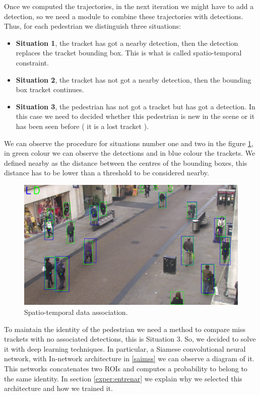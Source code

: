 Once we computed the trajectories, in the next iteration we might have to add a detection, so we need a module to combine these trajectories with detections. Thus, for each pedestrian we distinguish three situations:

\begin{itemize}



\item \textbf{Situation 1}, the tracket has got a nearby detection, then the detection replaces the tracket bounding box. This is what is called spatio-temporal constraint.

\item \textbf{Situation 2}, the tracket has not got a nearby detection, then the bounding box tracket continues.

\item \textbf{Situation 3}, the pedestrian has not got a tracket but has got a detection. In this case we need to decided whether this pedestrian is new in the scene or it has been seen before ( it is a lost tracket ).

\end{itemize}

We can observe the procedure for situations number one and two in the figure \ref{data1}, in green colour we can observe the detections and in blue colour the trackets. We defined nearby as the distance between the centres of the bounding boxes, this distance has to be lower than a threshold to be considered nearby. 

\begin{figure}[hptb]
\centering         
\includegraphics[width=12cm]{lucasKanade/dataAssociation.jpg}
\caption{Spatio-temporal data association.} \label{data1}
\end{figure}


To maintain the identity of the pedestrian we need a method to compare miss trackets with no associated detections, this is Situation 3. So, we decided to solve it with deep learning techniques. In particular, a Siamese convolutional neural network, with In-network architecture in \ref{saimss} we can observe a diagram of it. This networks concatenates two ROIs and computes a probability to belong to the same identity. In section \ref{exper:entrenar} we explain why we selected this architecture and how we trained it.



